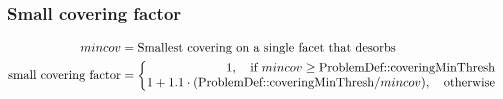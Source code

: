 \subsubsection*{Small covering factor}
\begin{equation}
	\label{eq:smallcov}
	\begin{split}
	mincov&=\text{Smallest covering on a single facet that desorbs}\\
	\text{small covering factor}&=
	\begin{cases}
		\begin{split}
		1,  \text{\quad if}\ mincov \geq \text{ProblemDef::coveringMinThresh}\\
		1+1.1 \cdot (\text{ProblemDef::coveringMinThresh}/mincov), \text{\quad otherwise}\\
		\end{split}
	\end{cases}
	\end{split}
\end{equation}
\begin{comment}
\subsubsection*{$K_{\text{real}/\text{virtual}}$}
\begin{equation}
	\label{eq:krealvirt}
	K_{\text{real}/\text{virtual}}=\frac{\sum\limits_{\text{facets}}\Big(out + des\Big)}{\text{number of total desorbed molecules/small covering factor}}
\end{equation}
\end{comment}
